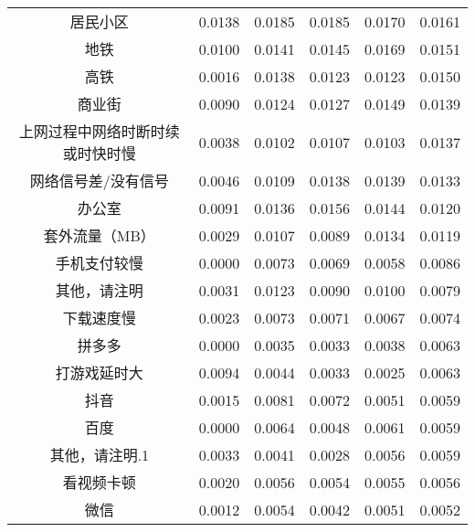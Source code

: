 \documentclass{MathorCupmodeling}
\begin{document}
\begin{table}[hb]
{\begin{tabular}{c|cccc|c}
	  居民小区  & 0.0138  & 0.0185  & 0.0185  & 0.0170  & 0.0161  \\
	  地铁    & 0.0100  & 0.0141  & 0.0145  & 0.0169  & 0.0151  \\
	  高铁    & 0.0016  & 0.0138  & 0.0123  & 0.0123  & 0.0150  \\
	  商业街   & 0.0090  & 0.0124  & 0.0127  & 0.0149  & 0.0139  \\
	  上网过程中网络时断时续或时快时慢 & 0.0038  & 0.0102  & 0.0107  & 0.0103  & 0.0137  \\
	  网络信号差/没有信号 & 0.0046  & 0.0109  & 0.0138  & 0.0139  & 0.0133  \\
	  办公室   & 0.0091  & 0.0136  & 0.0156  & 0.0144  & 0.0120  \\
	  套外流量（MB） & 0.0029  & 0.0107  & 0.0089  & 0.0134  & 0.0119  \\
	  手机支付较慢 & 0.0000  & 0.0073  & 0.0069  & 0.0058  & 0.0086  \\
	  其他，请注明 & 0.0031  & 0.0123  & 0.0090  & 0.0100  & 0.0079  \\
	  下载速度慢 & 0.0023  & 0.0073  & 0.0071  & 0.0067  & 0.0074  \\
	  拼多多   & 0.0000  & 0.0035  & 0.0033  & 0.0038  & 0.0063  \\
	  打游戏延时大 & 0.0094  & 0.0044  & 0.0033  & 0.0025  & 0.0063  \\
	  抖音    & 0.0015  & 0.0081  & 0.0072  & 0.0051  & 0.0059  \\
	  百度    & 0.0000  & 0.0064  & 0.0048  & 0.0061  & 0.0059  \\
	  其他，请注明.1 & 0.0033  & 0.0041  & 0.0028  & 0.0056  & 0.0059  \\
	  看视频卡顿 & 0.0020  & 0.0056  & 0.0054  & 0.0055  & 0.0056  \\
	  微信    & 0.0012  & 0.0054  & 0.0042  & 0.0051  & 0.0052  \\
	  \bottomrule
	  \end{tabular}}
	\label{tab:a2allquantizationA}
  	\end{table}
\end{document}
